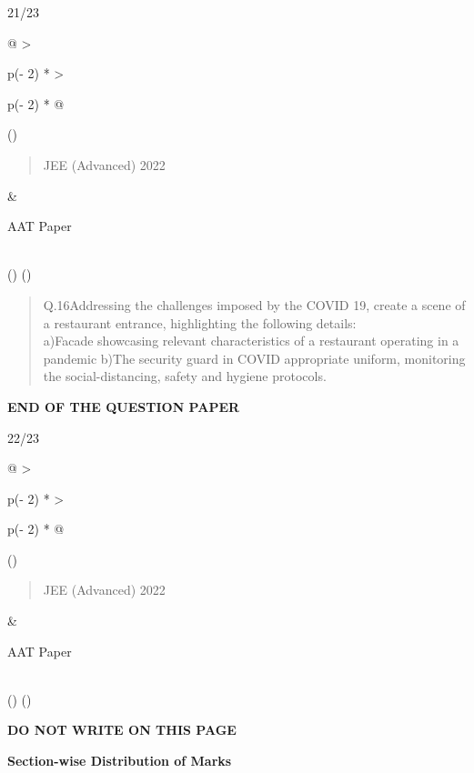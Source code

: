 \documentclass[
]{article}
\begin{document}
21/23

\begin{longtable}[]{@{}
  >{\raggedright\arraybackslash}p{(\columnwidth - 2\tabcolsep) * }
  >{\raggedright\arraybackslash}p{(\columnwidth - 2\tabcolsep) * }@{}}
\toprule()
\begin{minipage}[b]{\linewidth}\raggedright
\begin{quote}
JEE (Advanced) 2022
\end{quote}
\end{minipage} & \begin{minipage}[b]{\linewidth}\raggedright
AAT Paper
\end{minipage} \\
\midrule()
\endhead
\bottomrule()
\end{longtable}

\begin{quote}
Q.16Addressing the challenges imposed by the COVID 19, create a scene of
a restaurant entrance, highlighting the following details:\\
a)Facade showcasing relevant characteristics of a restaurant operating
in a pandemic b)The security guard in COVID appropriate uniform,
monitoring the social-distancing, safety and hygiene protocols.
\end{quote}

\textbf{END OF THE QUESTION PAPER}

22/23

\begin{longtable}[]{@{}
  >{\raggedright\arraybackslash}p{(\columnwidth - 2\tabcolsep) * }
  >{\raggedright\arraybackslash}p{(\columnwidth - 2\tabcolsep) * }@{}}
\toprule()
\begin{minipage}[b]{\linewidth}\raggedright
\begin{quote}
JEE (Advanced) 2022
\end{quote}
\end{minipage} & \begin{minipage}[b]{\linewidth}\raggedright
AAT Paper
\end{minipage} \\
\midrule()
\endhead
\bottomrule()
\end{longtable}

\textbf{DO NOT WRITE ON THIS PAGE}

\textbf{Section-wise Distribution of Marks}
\end{document}
